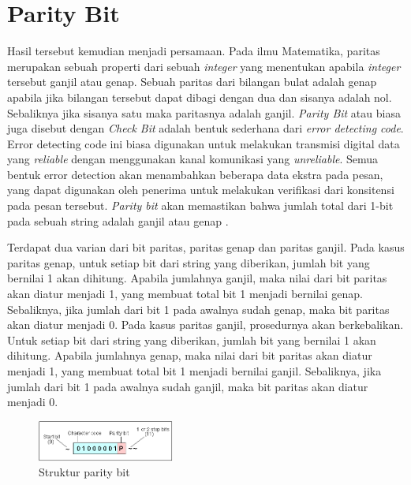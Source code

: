 \section{Parity Bit}
\label{sec:paritybit}


Hasil tersebut kemudian menjadi persamaan. Pada ilmu Matematika, paritas merupakan sebuah properti dari sebuah \emph{integer} yang menentukan apabila \emph{integer} tersebut ganjil atau genap. Sebuah paritas dari bilangan bulat adalah genap apabila jika bilangan tersebut dapat dibagi dengan dua dan sisanya adalah nol. Sebaliknya jika sisanya satu maka paritasnya adalah ganjil.
\emph{Parity Bit} atau biasa juga disebut dengan \emph{Check Bit} adalah bentuk sederhana dari \emph{error detecting code}. Error detecting code ini biasa digunakan untuk melakukan transmisi digital data yang \emph{reliable} dengan menggunakan kanal komunikasi yang \emph{unreliable}. Semua bentuk error detection akan menambahkan beberapa data ekstra pada pesan, yang dapat digunakan oleh penerima untuk melakukan verifikasi dari konsitensi pada pesan tersebut. \emph{Parity bit} akan memastikan bahwa jumlah total dari 1-bit pada sebuah string adalah ganjil atau genap \citep{rodger2015}.

Terdapat dua varian dari bit paritas, paritas genap dan paritas ganjil. Pada kasus paritas genap, untuk setiap bit dari string yang diberikan, jumlah bit yang bernilai 1 akan dihitung. Apabila jumlahnya ganjil, maka nilai dari bit paritas akan diatur menjadi 1, yang membuat total bit 1 menjadi bernilai genap. Sebaliknya, jika jumlah dari bit 1 pada awalnya sudah genap, maka bit paritas akan diatur menjadi 0. Pada kasus paritas ganjil, prosedurnya akan berkebalikan. Untuk setiap bit dari string yang diberikan, jumlah bit yang bernilai 1 akan dihitung. Apabila jumlahnya genap, maka nilai dari bit paritas akan diatur menjadi 1, yang membuat total bit 1 menjadi bernilai ganjil. Sebaliknya, jika jumlah dari bit 1 pada awalnya sudah ganjil, maka bit paritas akan diatur menjadi 0.

\begin{figure} [ht]
  \centering
  \includegraphics[width=0.4\textwidth]{gambar/parity.png}

  \caption{Struktur parity bit}
  \label{fig:parityexample}
\end{figure}

